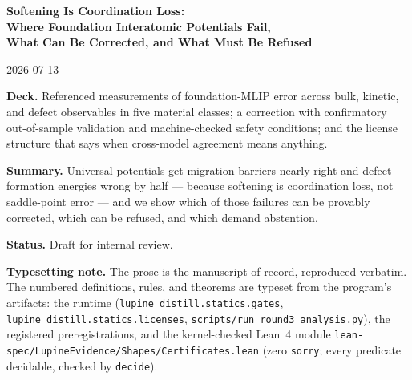 \documentclass[11pt]{article}
\theoremstyle{definition}
\theoremstyle{remark}
\newcommand{\code}[1]{\texttt{#1}}
\begin{document}
\begin{titlepage}
\centering
\vspace*{2.2cm}
{\LARGE\bfseries Softening Is Coordination Loss:\\[0.45em]
Where Foundation Interatomic Potentials Fail,\\[0.25em]
What Can Be Corrected, and What Must Be Refused\par}
\vspace{1.6cm}
{\large 2026-07-13\par}
\vspace{2.0cm}
\begin{minipage}{0.88\textwidth}
\small
\textbf{Deck.} Referenced measurements of foundation-MLIP error across bulk, kinetic, and defect observables in five material classes; a correction with confirmatory out-of-sample validation and machine-checked safety conditions; and the license structure that says when cross-model agreement means anything.

\medskip
\textbf{Summary.} Universal potentials get migration barriers nearly right and defect formation energies wrong by half --- because softening is coordination loss, not saddle-point error --- and we show which of those failures can be provably corrected, which can be refused, and which demand abstention.

\medskip
\textbf{Status.} Draft for internal review.

\medskip
\textbf{Typesetting note.} The prose is the manuscript of record, reproduced verbatim. The numbered definitions, rules, and theorems are typeset from the program's artifacts: the runtime (\code{lupine\_distill.statics.gates}, \code{lupine\_distill.statics.licenses}, \code{scripts/run\_round3\_analysis.py}), the registered preregistrations, and the kernel-checked Lean~4 module \code{lean-spec/LupineEvidence/Shapes/Certificates.lean} (zero \code{sorry}; every predicate decidable, checked by \code{decide}).
\end{minipage}
\vfill
\end{titlepage}

\noindent{}
\end{document}
